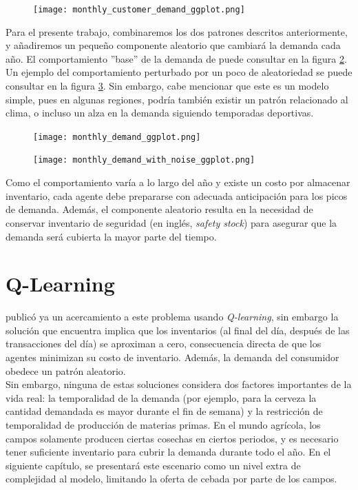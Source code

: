 \begin{figure}[ht!]
\caption{ }
\label{weekly_base}
\texttt{[image: monthly\_customer\_demand\_ggplot.png]}
\centering
\end{figure}

Para el presente trabajo, combinaremos los dos patrones descritos anteriormente, y a\~nadiremos un peque\~no componente aleatorio que cambiar\'a la demanda cada a\~no. El comportamiento ''base'' de la demanda de puede consultar en la figura \ref{yearly_base}. Un ejemplo del comportamiento perturbado por un poco de aleatoriedad se puede consultar en la figura \ref{yearly_base_noisy}. Sin embargo, cabe mencionar que este es un modelo simple, pues en algunas regiones, podr\'ia tambi\'en existir un patr\'on relacionado al clima, o incluso un alza en la demanda siguiendo temporadas deportivas. \\

\begin{figure}[ht!]
\caption{ }
\label{yearly_base}
\texttt{[image: monthly\_demand\_ggplot.png]}
\centering
\end{figure}

\begin{figure}[ht!]
\caption{ }
\label{yearly_base_noisy}
\texttt{[image: monthly\_demand\_with\_noise\_ggplot.png]}
\centering
\end{figure}

Como el comportamiento var\'ia a lo largo del a\~no y existe un costo por almacenar inventario, cada agente debe prepararse con adecuada anticipaci\'on para los picos de demanda. Adem\'as, el componente aleatorio resulta en la necesidad de conservar inventario de seguridad (en ingl\'es, \textit{safety stock}) para asegurar que la demanda ser\'a cubierta la mayor parte del tiempo.

\section{Q-Learning}

\citet{Chaharsooghi} public\'o ya un acercamiento a este problema usando \textit{Q-learning}, sin embargo la soluci\'on que encuentra implica que los inventarios (al final del d\'ia, despu\'es de las transacciones del d\'ia) se aproximan a cero, consecuencia directa de que los agentes minimizan su costo de inventario. Adem\'as, la demanda del consumidor obedece un patr\'on aleatorio.\\

Sin embargo, ninguna de estas soluciones considera dos factores importantes de la vida real: la temporalidad de la demanda (por ejemplo, para la cerveza la cantidad demandada es mayor durante el fin de semana) y la restricción de temporalidad de producci\'on de materias primas. En el mundo agr\'icola, los campos solamente producen ciertas cosechas en ciertos periodos, y es necesario tener suficiente inventario para cubrir la demanda durante todo el a\~no. En el siguiente cap\'itulo, se presentar\'a este escenario como un nivel extra de complejidad al modelo, limitando la oferta de cebada por parte de los campos.